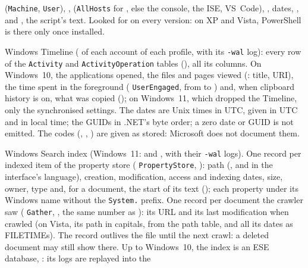 \documentclass[11pt,a4paper,oneside]{report}
\begin{document}
\begin{description}[style=nextline,leftmargin=1.2em]
         (\texttt{Machine}, \texttt{User}), ,
         (\texttt{AllHosts} for , else the
        console, the ISE, VS~Code), , dates, ,
         and , the script's text. Looked for on
        every version: on XP and Vista, PowerShell is there only once
        installed.
  \item[\fichier{activities\_cache.json}] Windows Timeline
        ( of each account of each profile, with
        its \texttt{-wal} log): every row of the \texttt{Activity} and
        \texttt{ActivityOperation} tables (), all its columns.
        On Windows~10, the applications opened, the files and pages viewed
        (: title, URI), the time spent in the foreground
        ( \texttt{UserEngaged}, from  to
        ) and, when clipboard history is on, what was copied
        (); on Windows~11, which dropped the
        Timeline, only the synchronised settings. The dates are Unix times in
        UTC, given in UTC and in local time; the GUIDs in .NET's byte order; a
        zero date or GUID is not emitted. The codes (,
        , ) are given as stored:
        Microsoft does not document them.
  \item[\fichier{search\_index.json}] Windows Search index (Windows~11:
         and , with their
        \texttt{-wal} logs). One record per indexed item of the property store
        ( \texttt{PropertyStore}, ): path
        (, and  in the interface's
        language), creation, modification, access and indexing dates, size,
        owner, type and, for a document, the start of its text
        (); each property under its Windows name
        without the \texttt{System.} prefix. One record per document the
        crawler saw ( \texttt{Gather}, , the
        same number as ): its URL and its last modification when
        crawled (on Vista, its path  in capitals, from the path
        table, and all its dates as FILETIMEs). The record outlives the file until the next crawl: a deleted
        document may still show there. Up to Windows~10, the index is an ESE
        database, : its logs are replayed into the

\end{description}
\end{document}
